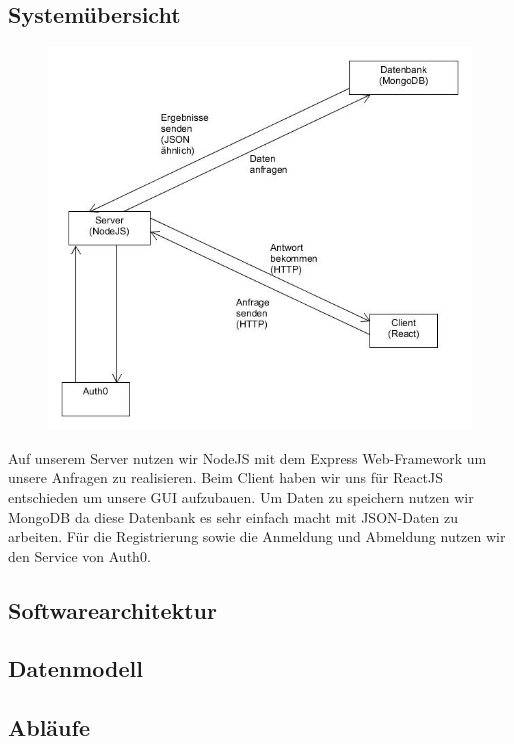 	\subsection{Systemübersicht}
		\begin{figure}[H]
			\includegraphics[scale=0.6]{images/SYCArchitektur}
		\end{figure}
	
	Auf unserem Server nutzen wir NodeJS mit dem Express Web-Framework um unsere Anfragen zu realisieren. Beim Client haben wir uns für ReactJS
	entschieden um unsere GUI aufzubauen. Um Daten zu speichern nutzen wir MongoDB da diese Datenbank es sehr einfach macht mit JSON-Daten zu arbeiten.
	Für die Registrierung sowie die Anmeldung und Abmeldung nutzen wir den Service von Auth0.
	
	\subsection{Softwarearchitektur}
	
	\subsection{Datenmodell}
	
	\subsection{Abläufe}
	
